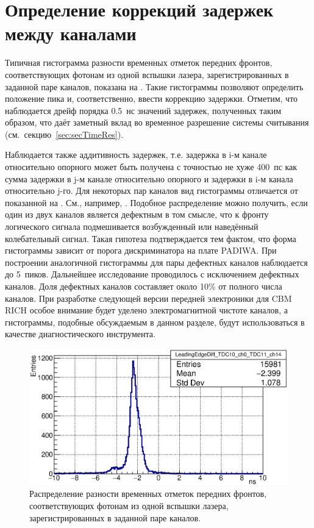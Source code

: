 \section{Определение коррекций задержек между каналами}\label{sec:secCorrections}

Типичная гистограмма разности временных отметок передних фронтов, соответствующих фотонам из одной вспышки лазера, зарегистрированных в заданной паре каналов, показана на . Такие гистограммы позволяют определить положение пика и, соответственно, ввести коррекцию задержки. Отметим, что наблюдается дрейф порядка 0.5~нс значений задержек, полученных таким образом, что даёт заметный вклад во временное разрешение системы считывания (см.~секцию~\ref{sec:secTimeRes}).

Наблюдается также аддитивность задержек, т.е. задержка в i-м канале относительно опорного может быть получена с точностью не хуже 400~пс как сумма задержки в j-м канале относительно опорного и задержки в i-м канала относительно j-го. Для некоторых пар каналов вид гистограммы отличается от показанной на . См., например, . Подобное распределение можно получить, если один из двух каналов является дефектным в том смысле, что к фронту логического сигнала подмешивается возбужденный или наведённый колебательный сигнал. Такая гипотеза подтверждается тем фактом, что форма гистограммы зависит от порога дискриминатора на плате PADIWA. При построении аналогичной гистограммы для пары дефектных каналов наблюдается до 5~пиков. Дальнейшее исследование проводилось с исключением дефектных каналов. Доля дефектных каналов составляет около 10\% от полного числа каналов. При разработке следующей версии передней электроники для CBM RICH особое внимание будет уделено электромагнитной чистоте каналов, а гистограммы, подобные обсуждаемым в данном разделе, будут использоваться в качестве диагностического инструмента.

\begin{figure}[H]
\centering
\includegraphics[width=1.0\textwidth]{pictures/22_LeadingEdgeDiff_TDC10_ch0_TDC11_ch14_feb2017.eps}
\caption{Распределение разности временных отметок передних фронтов, соответствующих фотонам из одной вспышки лазера, зарегистрированных в заданной паре каналов.}
\label{fig:TypicalLeadingEdgeDiff}
\end{figure}


